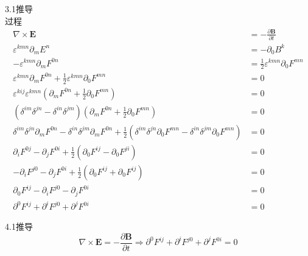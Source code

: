 3.1推导
\begin{equation}
    
\end{equation}
过程
\begin{equation}
    \begin{aligned}
        \nabla \times \mathbf{E}&=-\frac{\partial \mathbf{B}}{\partial t}
\\
\varepsilon ^{kmn}\partial _mE^n&=-\partial _0B^k
\\
-\varepsilon ^{kmn}\partial _mF^{0n}&=\frac{1}{2}\varepsilon ^{kmn}\partial _0F^{mn}
\\
\varepsilon ^{kmn}\partial _mF^{0n}+\frac{1}{2}\varepsilon ^{kmn}\partial _0F^{mn}&=0
\\
\varepsilon ^{kij}\varepsilon ^{kmn}\left( \partial _mF^{0n}+\frac{1}{2}\partial _0F^{mn} \right) &=0
\\
\left( \delta ^{im}\delta ^{jn}-\delta ^{in}\delta ^{jm} \right) \left( \partial _mF^{0n}+\frac{1}{2}\partial _0F^{mn} \right) &=0
\\
\delta ^{im}\delta ^{jn}\partial _mF^{0n}-\delta ^{in}\delta ^{jm}\partial _mF^{0n}+\frac{1}{2}\left( \delta ^{im}\delta ^{jn}\partial _0F^{mn}-\delta ^{in}\delta ^{jm}\partial _0F^{mn} \right) &=0
\\
\partial _iF^{0j}-\partial _jF^{0i}+\frac{1}{2}\left( \partial _0F^{ij}-\partial _0F^{ji} \right) &=0
\\
-\partial _iF^{j0}-\partial _jF^{0i}+\frac{1}{2}\left( \partial _0F^{ij}+\partial _0F^{ij} \right) &=0
\\
\partial _0F^{ij}-\partial _iF^{j0}-\partial _jF^{0i}&=0
\\
\partial ^0F^{ij}+\partial ^iF^{j0}+\partial ^jF^{0i}&=0
    \end{aligned}
\end{equation}







4.1推导
\begin{equation}
    \nabla \times \mathbf{E}=-\frac{\partial \mathbf{B}}{\partial t}\Rightarrow \partial ^0F^{ij}+\partial ^iF^{j0}+\partial ^jF^{0i}=0
\end{equation}

\begin{equation}
    \begin{aligned}
        
    \end{aligned}
\end{equation}



